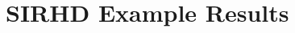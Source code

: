 \documentclass[10pt,letterpaper]{article}
\newcommand{\region}{\bf X}
\newcommand{\posregion}{{\region}^+}
\newcommand{\negregion}{{\region}^-}
\newcommand{\irrelevantregion}{{\region}^\oslash}
\newcommand{\point}{{\bf x}}
\newcommand{\model}{{\bf M}}
\newcommand{\query}{{\bf Q}}
\newcommand{\reals}{{\mathbb{R}}}
\begin{document}
\section{SIRHD Example Results}



% 

% 











\end{document}
